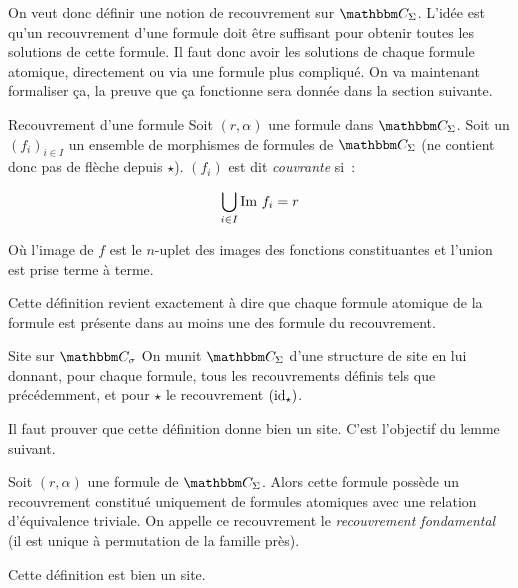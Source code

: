 On veut donc définir une notion de recouvrement sur $\C_\Sigma$. L'idée est
qu'un recouvrement d'une formule doit être suffisant pour obtenir toutes les
solutions de cette formule. Il faut donc avoir les solutions de chaque formule
atomique, directement ou via une formule plus compliqué. On va maintenant
formaliser ça, la preuve que ça fonctionne sera donnée dans la section
suivante.

\begin{defi}{Recouvrement d'une formule}
    Soit $(r,\alpha)$ une formule dans $\C_\Sigma$. Soit un $(f_i)_{i\in I}$ un ensemble
    de morphismes de formules de $\C_\Sigma$ (ne contient donc pas de flèche depuis
    $\star$). $(f_i)$ est dit \emph{couvrante} si~:

    \[ \bigcup_{i\in I} \text{Im } f_i = r \]

    Où l'image de $f$ est le $n$-uplet des images des fonctions constituantes et
    l'union est prise terme à terme.
\end{defi}

Cette définition revient exactement à dire que chaque formule atomique de la formule est
présente dans au moins une des formule du recouvrement.

\begin{defi}{Site sur $\C_\sigma$}
    On munit $\C_\Sigma$ d'une structure de site en lui donnant, pour chaque formule,
    tous les recouvrements définis tels que précédemment, et pour $\star$ le recouvrement
    $(\operatorname{id}_\star)$.
\end{defi}

Il faut prouver que cette définition donne bien un site. C'est l'objectif du
lemme suivant.

\begin{rem}
    Soit $(r,\alpha)$ une formule de $\C_\Sigma$. Alors cette formule possède un
    recouvrement constitué uniquement de formules atomiques avec une relation d'équivalence
    triviale. On appelle ce recouvrement le \emph{recouvrement fondamental}
    (il est unique à permutation de la famille près).
\end{rem}

\begin{lem}
    Cette définition est bien un site.
\end{lem}

